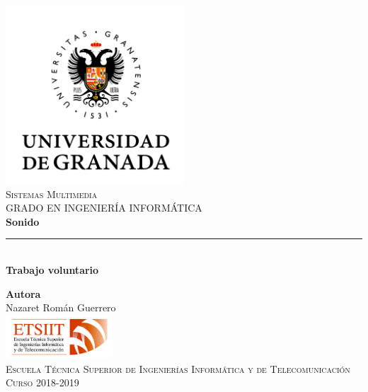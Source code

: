 \documentclass[11pt,a4paper]{article}
\begin{document}
\begin{titlepage}

\begin{minipage}{\textwidth}

\centering
\includegraphics[width=0.5\textwidth]{logo.png}\\

\textsc{\Large Sistemas Multimedia\\[0.2cm]}
\textsc{GRADO EN INGENIERÍA INFORMÁTICA}\\[1cm]

{\Huge\bfseries Sonido\\}
\noindent\rule[-1ex]{\textwidth}{3pt}\\[3.5ex]
{\large\bfseries Trabajo voluntario}
\end{minipage}

\vspace{1.5cm}
\begin{minipage}{\textwidth}
\centering

\textbf{Autora}\\ {Nazaret Román Guerrero}\\[2.5ex]
\includegraphics[width=0.3\textwidth]{etsiit.jpeg}\\[0.1cm]
\vspace{1cm}
\textsc{Escuela Técnica Superior de Ingenierías Informática y de Telecomunicación}\\
\vspace{1cm}
\textsc{Curso 2018-2019}
\end{minipage}
\end{titlepage}

\tableofcontents
\thispagestyle{empty}
\end{document}
